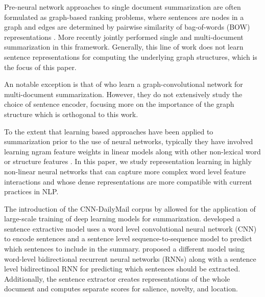 

Pre-neural network
approaches to single document summarization
are often formulated as graph-based ranking problems, where
sentences are nodes in a graph and edges are determined by pairwise 
similarity of bag-of-words (BOW) representations 
\cite{erkan2004lexrank,mihalcea2005language}. 
More recently \citet{wan2010towards}
jointly performed single and multi-document summarization in this framework. 
Generally, this line of work does not learn sentence representations for 
computing the underlying graph structures, which is the focus of this paper.

An notable exception is that of
\citet{yasunaga2017graph}
who
learn a graph-convolutional network for
multi-document summarization. However, they do not extensively study the 
choice of sentence encoder, focusing more on the importance of the 
graph structure which is orthogonal to this work.

To the extent that learning based approaches have been applied
to summarization prior to the use of neural networks, typically they have involved learning ngram feature weights 
in linear models along with other non-lexical word or 
structure features 
\cite{berg2011jointly,sipos2012large,durrett2016learning}.
In this paper, we study representation learning in highly non-linear
neural networks that can capture more complex word level feature interactions
and whose dense representations are more compatible with current practices
in NLP.

The introduction of the CNN-DailyMail corpus by \cite{nips15_hermann}
allowed for the application of large-scale training of deep learning models for summarization.
\citet{cheng2016neural} %
developed a sentence extractive
model uses a word level convolutional neural network (CNN) to encode 
sentences and a sentence level sequence-to-sequence model to predict 
which sentences to include in the summary. \citet{nallapati2017summarunner}
proposed a different model using word-level bidirectional recurrent neural 
networks (RNNs) along with a sentence level bidirectinoal RNN for 
predicting which sentences should be extracted. 
Additionally, the sentence
extractor creates representations of the whole document and computes 
separate scores for salience, novelty, and location.

